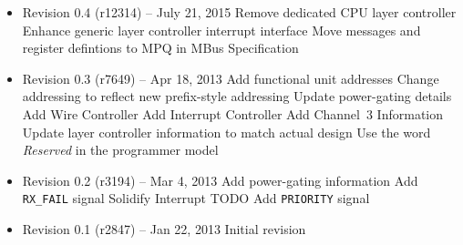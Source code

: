 \documentclass[twoside]{article}
\begin{document}
\begin{itemize}

\item Revision 0.4 {\footnotesize(r12314)} -- July 21, 2015
  \subitem Remove dedicated CPU layer controller
  \subitem Enhance generic layer controller interrupt interface
  \subitem Move messages and register defintions to MPQ in MBus Specification

\item Revision 0.3 {\footnotesize(r7649)} -- Apr 18, 2013
\subitem Add functional unit addresses
\subitem Change addressing to reflect new prefix-style addressing
\subitem Update power-gating details
\subitem Add Wire Controller
\subitem Add Interrupt Controller
\subitem Add Channel~3 Information
\subitem Update layer controller information to match actual design
\subitem Use the word {\em Reserved} in the programmer model

\item Revision 0.2 {\footnotesize(r3194)} -- Mar 4, 2013
\subitem Add power-gating information
\subitem Add {\tt RX\_FAIL} signal
\subitem Solidify Interrupt TODO
\subitem Add {\tt PRIORITY} signal

\item Revision 0.1 {\footnotesize(r2847)} -- Jan 22, 2013
\subitem Initial revision

\end{itemize}
\end{document}
